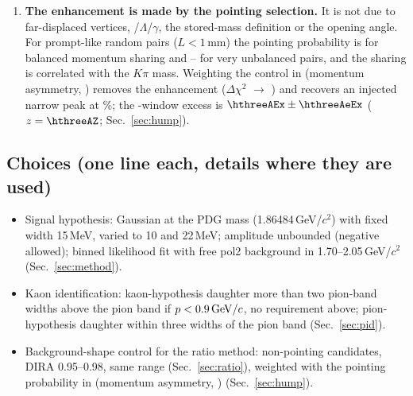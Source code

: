 \begin{enumerate}
  sample show a broad enhancement centred at \ratioFullBMean\,GeV/$c^2$ (DIRA$>0.995$, \Ls$>2$); a narrow 15\,MeV
  Gaussian at the \Dzero{} mass reaches $z=\ratioFullBZfour$ with a pol4 background but $z=\ratioFullBZnb$ once the broad
  component is included (Sec.~\ref{sec:ratio}).
\item \textbf{The enhancement is made by the pointing selection.} It is not due to far-displaced vertices, \Ks/$\Lambda$/$\gamma$,
  the stored-mass definition or the opening angle. For prompt-like random pairs ($L<1$\,mm) the pointing probability is
  \hthreeRaMid{} for balanced momentum sharing and \hthreeRaLo--\hthreeRaHi{} for very unbalanced pairs, and the sharing is
  correlated with the $K\pi$ mass. Weighting the control in (momentum asymmetry, \pt) removes the enhancement
  ($\Delta\chi^2$ \hthreeRDchi{} $\to$ \hthreeADchi) and recovers an injected narrow peak at \hthreeARec\%; the \Dzero-window
  excess is $\hthreeAEx\pm\hthreeAeEx$ ($z=\hthreeAZ$; Sec.~\ref{sec:hump}).
\end{enumerate}

\subsection*{Choices (one line each, details where they are used)}
\begin{itemize}
\item Signal hypothesis: Gaussian at the PDG \Dzero{} mass (1.86484\,GeV/$c^2$) with fixed width 15\,MeV, varied to
  10 and 22\,MeV; amplitude unbounded (negative allowed); binned likelihood fit with free pol2 background in
  1.70--2.05\,GeV/$c^2$ (Sec.~\ref{sec:method}).
\item Kaon identification: kaon-hypothesis daughter more than two pion-band widths above the pion band if $p<0.9\,\mathrm{GeV}/c$,
  no requirement above; pion-hypothesis daughter within three widths of the pion band (Sec.~\ref{sec:pid}).
\item Background-shape control for the ratio method: non-pointing candidates, DIRA 0.95--0.98, same \pt{} range
  (Sec.~\ref{sec:ratio}), weighted with the pointing probability in (momentum asymmetry, \pt) (Sec.~\ref{sec:hump}).
\end{itemize}


